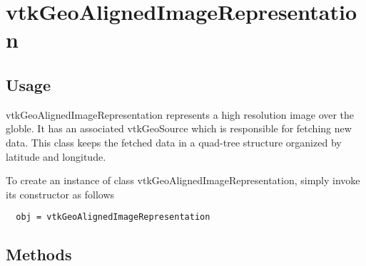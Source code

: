 \section{vtkGeoAlignedImageRepresentation}

\subsection{Usage}

 vtkGeoAlignedImageRepresentation represents a high resolution image
 over the globle. It has an associated vtkGeoSource which is responsible
 for fetching new data. This class keeps the fetched data in a quad-tree
 structure organized by latitude and longitude.

To create an instance of class vtkGeoAlignedImageRepresentation, simply
invoke its constructor as follows
\begin{verbatim}
  obj = vtkGeoAlignedImageRepresentation
\end{verbatim}
\subsection{Methods}

